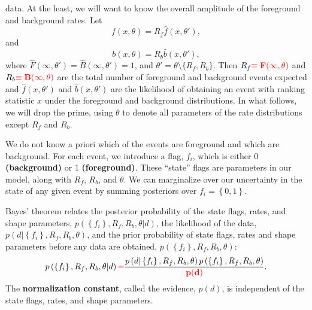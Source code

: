 \documentclass[aps,prd]{revtex4-1}
\newcommand{\mathset}[1]{\left\{ #1 \right\}}
\newcommand{\ilya}[1]{{\color{red} \bf #1}}
\begin{document}
data.  At the least, we will want to know the overall amplitude of the
foreground and background rates.  Let
\begin{equation}
  f(x,\theta) = R_f \hat{f}(x,\theta'),
\end{equation}
and 
\begin{equation}
  b(x, \theta) = R_b \hat{b}(x, \theta'),
\end{equation}
where $\hat{F}(\infty, \theta') = \hat{B}(\infty, \theta') = 1$, and
$\theta' = \theta \setminus \{R_{f}, R_{b} \}$.  Then $R_f\ilya{\equiv
  F(\infty,\theta)}$ and $R_b\ilya{\equiv B(\infty,\theta)}$ are the
total number of foreground and background events expected and
$\hat{f}(x, \theta')$ and $\hat{b}(x, \theta')$ are the likelihood of
obtaining an event with ranking statistic $x$ under the foreground and
background distributions.  In what follows, we will drop the prime,
using $\theta$ to denote all parameters of the rate distributions
except $R_f$ and $R_b$.

We do not know a priori which of the events are foreground and which
are background.  For each event, we introduce a flag, $f_i$, which is
either 0 \ilya{(background)} or 1 \ilya{(foreground)}.  These
``state'' flags are parameters in our model, along with $R_f$, $R_b$,
and $\theta$.  We can marginalize over our uncertainty in the state of
any given event by summing posteriors over $f_i = \mathset{0,1}$.

Bayes' theorem relates the posterior probability of the state flags,
rates, and shape parameters, $p\left(\mathset{f_i}, R_f, R_b, \theta |
  d \right)$, the likelihood of the data, $p\left( d | \mathset{f_i},
  R_f, R_b, \theta\right)$, and the prior probability of state flags,
rates and shape parameters before any data are obtained, $p\left(
  \mathset{f_i}, R_f, R_b, \theta\right)$:
\begin{equation}
  \label{eq:Bayes}
  p\left(\mathset{f_i}, R_f, R_b, \theta | d \right)  \ilya{=}
  \frac{p\left( d | \mathset{f_i}, R_f, R_b, \theta\right)
  p\left(\mathset{f_i}, R_f, R_b, \theta\right)}{\ilya{p(d)}}. 
\end{equation}
The \ilya{normalization constant}, called the evidence, $p(d)$, is
independent of the state flags, rates, and shape parameters.
\end{document}
